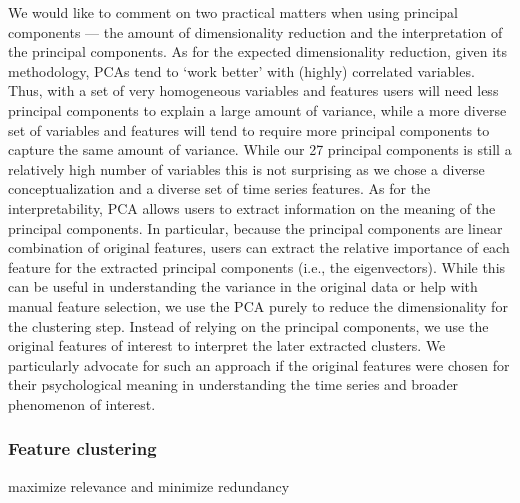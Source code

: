 We would like to comment on two practical matters when using principal
components --- the amount of dimensionality reduction and the
interpretation of the principal components. As for the expected
dimensionality reduction, given its methodology, PCAs tend to `work
better' with (highly) correlated variables. Thus, with a set of very
homogeneous variables and features users will need less principal
components to explain a large amount of variance, while a more diverse
set of variables and features will tend to require more principal
components to capture the same amount of variance. While our 27
principal components is still a relatively high number of variables this
is not surprising as we chose a diverse conceptualization and a diverse
set of time series features. As for the interpretability, PCA allows
users to extract information on the meaning of the principal components.
In particular, because the principal components are linear combination
of original features, users can extract the relative importance of each
feature for the extracted principal components (i.e., the eigenvectors).
While this can be useful in understanding the variance in the original
data or help with manual feature selection, we use the PCA purely to
reduce the dimensionality for the clustering step. Instead of relying on
the principal components, we use the original features of interest to
interpret the later extracted clusters. We particularly advocate for
such an approach if the original features were chosen for their
psychological meaning in understanding the time series and broader
phenomenon of interest.

\subsubsection{Feature clustering}

maximize relevance and minimize redundancy
